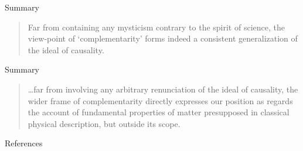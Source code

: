 \documentclass[fleqn]{beamer}
\begin{document}
\begin{frame}{Summary}

  \begin{quote} Far from containing any mysticism contrary to the
    spirit of science, the view-point of `complementarity' forms
    indeed a consistent generalization of the ideal of
    causality. \citep[p 269]{natural1939} \end{quote}


\end{frame}

\begin{frame}{Summary}

  \begin{quote} \dots far from involving any arbitrary renunciation of
    the ideal of causality, the wider frame of complementarity
    directly expresses our position as regards the account of
    fundamental properties of matter presupposed in classical physical
    description, but outside its scope. \citep[p
    314]{qphil1958} \end{quote}

\end{frame}


\begin{frame}[allowframebreaks]{References}

  \nocite{faye1979}

\printbibliography[heading=none]

\end{frame}
\end{document}
